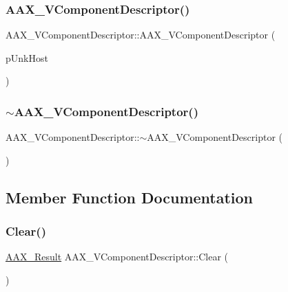 \subsubsection{\texorpdfstring{AAX\_VComponentDescriptor()}{AAX\_VComponentDescriptor()}}
{\footnotesize\ttfamily A\+A\+X\+\_\+\+V\+Component\+Descriptor\+::\+A\+A\+X\+\_\+\+V\+Component\+Descriptor (\begin{DoxyParamCaption}\item[{\mbox{\hyperlink{a01409}{I\+A\+C\+F\+Unknown}} $\ast$}]{p\+Unk\+Host }\end{DoxyParamCaption})}

\mbox{\label{a01901_a9e49ea29b3d98251bb17542d5c24f711}} 
\subsubsection{\texorpdfstring{$\sim$AAX\_VComponentDescriptor()}{~AAX\_VComponentDescriptor()}}
{\footnotesize\ttfamily A\+A\+X\+\_\+\+V\+Component\+Descriptor\+::$\sim$\+A\+A\+X\+\_\+\+V\+Component\+Descriptor (\begin{DoxyParamCaption}{ }\end{DoxyParamCaption})}



\subsection{Member Function Documentation}
\mbox{\label{a01901_a46226eb4c9b31c5c55296bab4f02d91c}} 
\subsubsection{\texorpdfstring{Clear()}{Clear()}}
{\footnotesize\ttfamily \mbox{\hyperlink{a00392_a4d8f69a697df7f70c3a8e9b8ee130d2f}{A\+A\+X\+\_\+\+Result}} A\+A\+X\+\_\+\+V\+Component\+Descriptor\+::\+Clear (\begin{DoxyParamCaption}{ }\end{DoxyParamCaption})\hspace{0.3cm}{\ttfamily [virtual]}}



